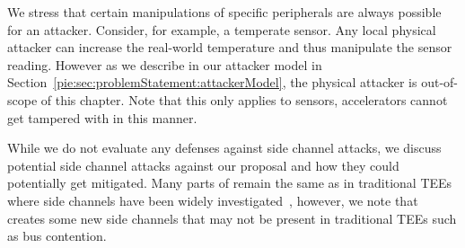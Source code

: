 We stress that certain manipulations of specific peripherals are always possible for an attacker. Consider, for example, a temperate sensor. Any local physical attacker can increase the real-world temperature and thus manipulate the sensor reading. However as we describe in our attacker model in Section~\ref{pie:sec:problemStatement:attackerModel}, the physical attacker is out-of-scope of this chapter. Note that this only applies to sensors, accelerators cannot get tampered with in this manner.

While we do not evaluate any defenses against side channel attacks, we discuss potential side channel attacks against our proposal and how they could potentially get mitigated. Many parts of \name{} remain the same as in traditional TEEs where side channels have been widely investigated~\cite{brasser2017software,brasser2019dr,gruss2017strongsidechannel}, however, we note that \name{} creates some new side channels that may not be present in traditional TEEs such as bus contention. 

